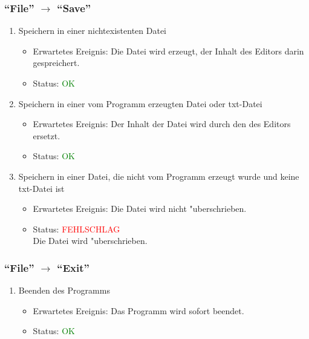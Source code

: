 \subsubsection{"`File"' $\rightarrow$ "`Save"'}
\begin{enumerate}
\item Speichern in einer nichtexistenten Datei
\begin{itemize}
\item Erwartetes Ereignis: Die Datei wird erzeugt, der Inhalt des Editors darin gespreichert. 
\item Status: \textcolor{green}{OK} 
\end{itemize}
\item Speichern in einer vom Programm erzeugten Datei oder txt-Datei
\begin{itemize}
\item Erwartetes Ereignis: Der Inhalt der Datei wird durch den des Editors ersetzt. 
\item Status: \textcolor{green}{OK} 
\end{itemize}
\item Speichern in einer Datei, die nicht vom Programm erzeugt wurde und keine txt-Datei ist
\begin{itemize}
\item Erwartetes Ereignis: Die Datei wird nicht "uberschrieben. 
\item Status: \textcolor{red}{FEHLSCHLAG} \\
Die Datei wird "uberschrieben.
\end{itemize}
\end{enumerate}
\subsubsection{"`File"' $\rightarrow$ "`Exit"'}
\begin{enumerate}
\item Beenden des Programms
\begin{itemize}
\item Erwartetes Ereignis: Das Programm wird sofort beendet. 
\item Status: \textcolor{green}{OK}
\end{itemize}
\end{enumerate}
